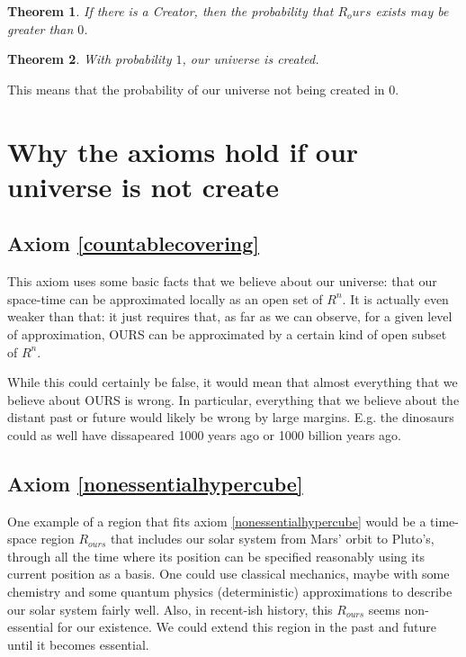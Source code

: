 \documentclass[a4paper
,draft
]{article}
\newtheorem{theorem}{Theorem}[section]
\begin{document}
\begin{theorem}
If there is a Creator, then the probability that $R_ours$ exists may be greater than $0$.
\end{theorem}

\begin{theorem}
With probability $1$, our universe is created.
\end{theorem}

This means that the probability of our universe not being created in $0$.

\section{Why the axioms hold if our universe is not create}

\subsection{Axiom \ref{countablecovering}}

This axiom uses some basic facts that we believe about our universe: that our space-time can be approximated locally as an open set of $R^n$. It is actually even weaker than that: it just requires that, as far as we can observe, for a given level of approximation, OURS can be approximated by a certain kind of open subset of $R^n$.

While this could certainly be false, it would mean that almost everything that we believe about OURS is wrong. In particular, everything that we believe about the distant past or future would likely be wrong by large margins. E.g. the dinosaurs could as well have dissapeared 1000 years ago or 1000 billion years ago.

\subsection{Axiom \ref{nonessentialhypercube}}

One example of a region that fits axiom \ref{nonessentialhypercube} would be a time-space region $R_{ours}$ that includes our solar system from Mars' orbit to Pluto's, through all the time where its position can be specified reasonably using its current position as a basis. One could use classical mechanics, maybe with some chemistry and some quantum physics (deterministic) approximations to describe our solar system fairly well. Also, in recent-ish history, this $R_{ours}$ seems non-essential for our existence. We could extend this region in the past and future until it becomes essential.
\end{document}
